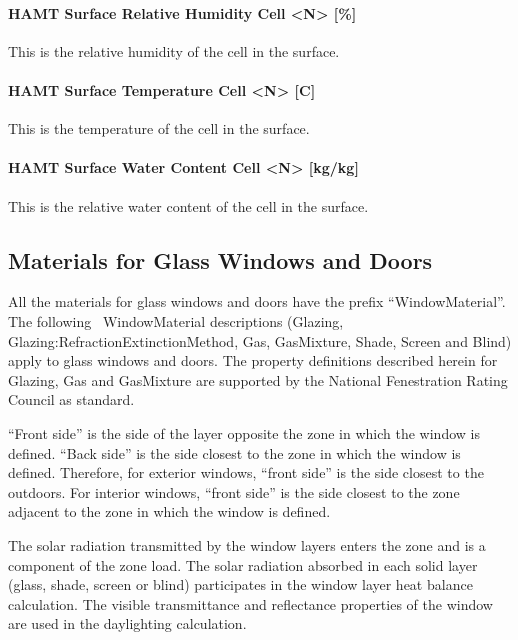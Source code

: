\paragraph{HAMT Surface Relative Humidity Cell \textless{}N\textgreater{} {[}\%{]}}\label{hamt-surface-relative-humidity-cell-n}

This is the relative humidity of the cell in the surface.

\paragraph{HAMT Surface Temperature Cell \textless{}N\textgreater{} {[}C{]}}\label{hamt-surface-temperature-cell-n-c}

This is the temperature of the cell in the surface.

\paragraph{HAMT Surface Water Content Cell \textless{}N\textgreater{} {[}kg/kg{]}}\label{hamt-surface-water-content-cell-n-kgkg}

This is the relative water content of the cell in the surface.

\subsection{Materials for Glass Windows and Doors}\label{materials-for-glass-windows-and-doors}

All the materials for glass windows and doors have the prefix ``WindowMaterial''. The following~ WindowMaterial descriptions (Glazing, Glazing:RefractionExtinctionMethod, Gas, GasMixture, Shade, Screen and Blind) apply to glass windows and doors. The property definitions described herein for Glazing, Gas and GasMixture are supported by the National Fenestration Rating Council as standard.

``Front side'' is the side of the layer opposite the zone in which the window is defined. ``Back side'' is the side closest to the zone in which the window is defined. Therefore, for exterior windows, ``front side'' is the side closest to the outdoors. For interior windows, ``front side'' is the side closest to the zone adjacent to the zone in which the window is defined.

The solar radiation transmitted by the window layers enters the zone and is a component of the zone load. The solar radiation absorbed in each solid layer (glass, shade, screen or blind) participates in the window layer heat balance calculation. The visible transmittance and reflectance properties of the window are used in the daylighting calculation.

